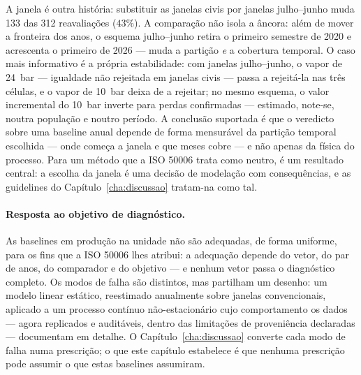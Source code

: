 A janela é outra história: substituir as janelas civis por janelas
julho--junho muda 133 das 312 reavaliações ($43\%$). A comparação não isola a
âncora: além de mover a fronteira dos anos, o esquema julho--junho retira o
primeiro semestre de 2020 e acrescenta o primeiro de 2026 --- muda a partição
\emph{e} a cobertura temporal. O caso mais informativo é a própria
estabilidade: com janelas julho--junho, o vapor de 24~bar --- igualdade não
rejeitada em janelas civis --- passa a rejeitá-la nas três células, e o vapor
de 10~bar deixa de a rejeitar; no mesmo esquema, o valor incremental do
10~bar inverte para perdas confirmadas --- estimado, note-se, noutra
população e noutro período. A conclusão suportada é que o veredicto sobre uma
baseline anual depende de forma mensurável da partição temporal escolhida ---
onde começa a janela e que meses cobre --- e não apenas da física do
processo. Para um método que a ISO 50006 trata como neutro, é um resultado
central: a escolha da janela é uma decisão de modelação com consequências, e
as guidelines do Capítulo~\ref{cha:discussao} tratam-na como tal.

\paragraph{Resposta ao objetivo de diagnóstico.} As baselines em produção na
unidade não são adequadas, de forma uniforme, para os fins que a ISO 50006
lhes atribui: a adequação depende do vetor, do par de anos, do comparador e
do objetivo --- e nenhum vetor passa o diagnóstico completo. Os modos
de falha são distintos, mas partilham um desenho: um modelo linear
estático, reestimado anualmente sobre janelas convencionais, aplicado a um
processo contínuo não-estacionário cujo comportamento os dados --- agora
replicados e auditáveis, dentro das limitações de proveniência declaradas ---
documentam em detalhe. O Capítulo~\ref{cha:discussao} converte cada modo de
falha numa prescrição; o que este capítulo estabelece é que nenhuma prescrição pode
assumir o que estas baselines assumiram.

